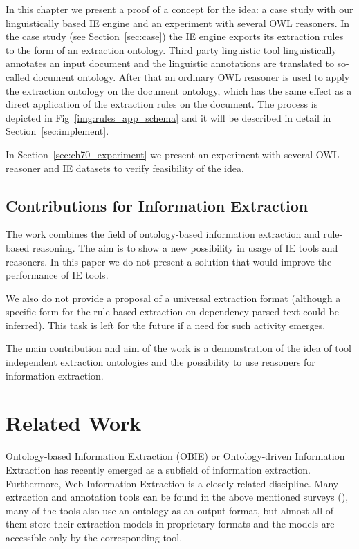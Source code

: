 In this chapter we present a proof of a concept for the idea: a case study with our linguistically based IE engine and an experiment with several OWL reasoners. In the case study (see Section~\ref{sec:case}) the IE engine exports its extraction rules to the form of an extraction ontology. Third party linguistic tool linguistically annotates an input document and the linguistic annotations are translated to so-called document ontology. After that an ordinary OWL reasoner is used to apply the extraction ontology on the document ontology, which has the same effect as a direct application of the extraction rules on the document. The process is depicted in Fig~\ref{img:rules_app_schema} and it will be described in detail in Section~\ref{sec:implement}.


In Section~\ref{sec:ch70_experiment} we present an experiment with several OWL reasoner and IE datasets to verify feasibility of the idea.  


\subsection{Contributions for Information Extraction}
The work combines the field of ontology-based information extraction and rule-based reasoning. The aim is to show a new possibility in usage of IE tools and reasoners. In this paper we do not present a solution that would improve the performance of IE tools.

We also do not provide a proposal of a universal extraction format (although a specific form for the rule based extraction on dependency parsed text could be inferred). This task is left for the future if a need for such activity emerges.

The main contribution and aim of the work is a demonstration of the idea of tool independent extraction ontologies and the possibility to use reasoners for information extraction.


\section{Related Work}
Ontology-based Information Extraction (OBIE) \citep{citeulike:7291004} or Ontology-driven Information Extraction \citep{Yildiz:2007:OMO:1793154.1793216} has recently emerged as a subfield of information extraction. Furthermore, Web Information Extraction \citep{DBLP:journals/tkde/ChangKGS06} is a closely related discipline. Many extraction and annotation tools can be found in the above mentioned surveys (\citep{citeulike:7291004,DBLP:journals/tkde/ChangKGS06}), many of the tools also use an ontology as an output format, but almost all of them store their extraction models in proprietary formats and the models are accessible only by the corresponding tool.

